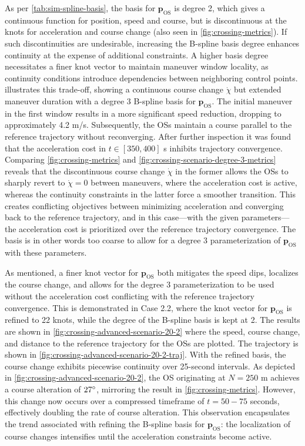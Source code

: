 As per \cref{tab:sim-spline-basis}, the basis for $\mathbf p_\text{OS}$ is degree 2, which gives a continuous function for position, speed and course, but is discontinuous at the knots for acceleration and course change (also seen in \cref{fig:crossing-metrics}). 
If such discontinuities are undesirable, increasing the B-spline basis degree enhances continuity at the expense of additional constraints. A higher basis degree necessitates a finer knot vector to maintain maneuver window locality, as continuity conditions introduce dependencies between neighboring control points.  illustrates this trade-off, showing a continuous course change $\dot\chi$ but extended maneuver duration with a degree 3 B-spline basis for $\mathbf p_\text{OS}$. 
The initial maneuver in the first window results in a more significant speed reduction, dropping to approximately 4.2 m/s. Subsequently, the OSs maintain a course parallel to the reference trajectory without reconverging. After further inspection it was found that the acceleration cost in $t\in[350, 400]$ s inhibits trajectory convergence. 
Comparing \cref{fig:crossing-metrics} and \cref{fig:crossing-scenario-degree-3-metrics} reveals that the discontinuous course change $\dot{\chi}$ in the former allows the OSs to sharply revert to $\dot{\chi}=0$ between maneuvers, where the acceleration cost is active, whereas the continuity constraints in the latter force a smoother transition. This creates conflicting objectives between minimizing acceleration and converging back to the reference trajectory, and in this case---with the given parameters---the acceleration cost is prioritized over the reference trajectory convergence. The basis is in other words too coarse to allow for a degree 3 parameterization of $\mathbf p_\text{OS}$ with these parameters.

As mentioned, a finer knot vector for $\mathbf p_\text{OS}$ both mitigates the speed dips, localizes the course change, and allows for the degree 3 parameterization to be used without the acceleration cost conflicting with the reference trajectory convergence. This is demonstrated in Case 2.2, where the knot vector for $\mathbf p_\text{OS}$ is refined to 22 knots, while the degree of the B-spline basis is kept at 2. The results are shown in \cref{fig:crossing-advanced-scenario-20-2} where the speed, course change, and distance to the reference trajectory for the OSs are plotted. The trajectory is shown in \cref{fig:crossing-advanced-scenario-20-2-traj}. 
With the refined basis, the course change exhibits piecewise continuity over 25-second intervals. As depicted in \cref{fig:crossing-advanced-scenario-20-2}, the OS originating at $N=250$ m achieves a course alteration of $27\degree$, mirroring the result in \cref{fig:crossing-metrics}. However, this change now occurs over a compressed timeframe of $t=50-75$ seconds, effectively doubling the rate of course alteration. This observation encapsulates the trend associated with refining the B-spline basis for $\mathbf p_\text{OS}$: the localization of course changes intensifies until the acceleration constraints become active.




